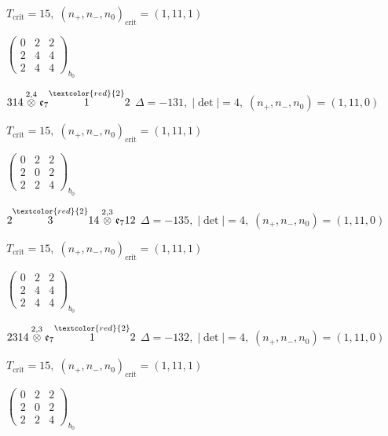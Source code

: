 \documentclass[10pt]{article}
\begin{document}
\hspace{1em}$T_{\text{crit}}=15,\; (n_+,n_-,n_0)_{\text{crit}}=(1,11,1)$

\hspace{2em}$\left(\begin{smallmatrix}0 & 2 & 2 \\ 2 & 4 & 4 \\ 2 & 4 & 4\end{smallmatrix}\right)_{\!b_0}$

\smallskip

$314\overset{2,4}{\otimes}\mathfrak{e}_7\overset{\textcolor{red}{2}}{1}2$ \quad $\Delta=-131,\; |\det|=4,\; (n_+,n_-,n_0)=(1,11,0)$

\hspace{1em}$T_{\text{crit}}=15,\; (n_+,n_-,n_0)_{\text{crit}}=(1,11,1)$

\hspace{2em}$\left(\begin{smallmatrix}0 & 2 & 2 \\ 2 & 0 & 2 \\ 2 & 2 & 4\end{smallmatrix}\right)_{\!b_0}$

\smallskip

$2\overset{\textcolor{red}{2}}{3}14\overset{2,3}{\otimes}\mathfrak{e}_712$ \quad $\Delta=-135,\; |\det|=4,\; (n_+,n_-,n_0)=(1,11,0)$

\hspace{1em}$T_{\text{crit}}=15,\; (n_+,n_-,n_0)_{\text{crit}}=(1,11,1)$

\hspace{2em}$\left(\begin{smallmatrix}0 & 2 & 2 \\ 2 & 4 & 4 \\ 2 & 4 & 4\end{smallmatrix}\right)_{\!b_0}$

$2314\overset{2,3}{\otimes}\mathfrak{e}_7\overset{\textcolor{red}{2}}{1}2$ \quad $\Delta=-132,\; |\det|=4,\; (n_+,n_-,n_0)=(1,11,0)$

\hspace{1em}$T_{\text{crit}}=15,\; (n_+,n_-,n_0)_{\text{crit}}=(1,11,1)$

\hspace{2em}$\left(\begin{smallmatrix}0 & 2 & 2 \\ 2 & 0 & 2 \\ 2 & 2 & 4\end{smallmatrix}\right)_{\!b_0}$
\end{document}
